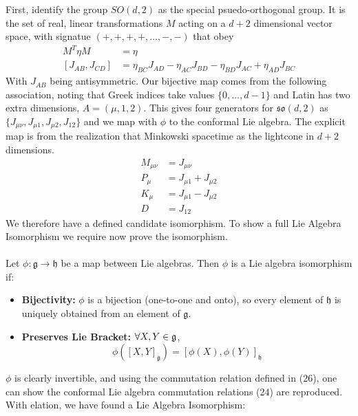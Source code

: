 \documentclass{article}
\begin{document}
First, identify the group $SO(d,2)$ as the special psuedo-orthogonal group. It is the set of real, linear transformations $M$ acting on a $d+2$ dimensional vector space, with signatue $(+,+,+,+,...,-,-)$ that obey
\begin{equation}
\begin{aligned}
M^T \eta M &= \eta \\
[J_{AB}, J_{CD}] &= \eta_{BC}J_{AD}
- \eta_{AC}J_{BD}
- \eta_{BD}J_{AC}
+ \eta_{AD}J_{BC}
\end{aligned}
\end{equation}
With $J_{AB}$ being antisymmetric. Our bijective map comes from the following association, noting that Greek indices take values $\{0,...,d-1\}$ and Latin has two extra dimensions, $A = (\mu, 1, 2)$. This gives four generators for $\mathfrak{so}(d,2)$ as $\{J_{\mu\nu},J_{\mu 1}, J_{\mu 2}, J_{12}\}$ and we map with $\phi$ to the conformal Lie algebra. The explicit map is from the realization that Minkowski spacetime as the lightcone in $d + 2$ dimensions. 
\begin{equation}
\begin{aligned}
M_{\mu\nu} &= J_{\mu\nu} \\
P_\mu &= J_{\mu 1} + J_{\mu 2} \\
K_\mu &= J_{\mu 1} - J_{\mu 2} \\
D &= J_{12}
\end{aligned}
\end{equation}
We therefore have a defined candidate isomorphism. To show a full Lie Algebra Isomorphism we require now prove the isomorphism.\\\\
Let $\phi:\mathfrak{g}\to\mathfrak{h}$ be a map between Lie algebras. Then $\phi$ is a Lie algebra isomorphism if:
\begin{itemize}
    \item \textbf{Bijectivity:} $\phi$ is a bijection (one-to-one and onto), so every element of $\mathfrak{h}$ is uniquely obtained from an element of $\mathfrak{g}$.

    \item \textbf{Preserves Lie Bracket:}  $\forall \space \space X,Y \in \mathfrak{g}$,
    \[
    \phi([X,Y]_{\mathfrak{g}}) = [\phi(X), \phi(Y)]_{\mathfrak{h}}
    \]
\end{itemize}
$\phi$ is clearly invertible, and using the commutation relation defined in (26), one can show the conformal Lie algebra commutation relations (24) are reproduced. With elation, we have found a Lie Algebra Isomorphism: 
\end{document}

